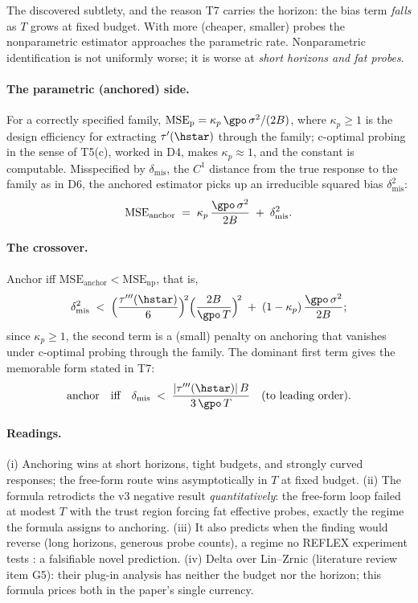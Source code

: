 The discovered subtlety, and the reason T7 carries the horizon: the bias
term \emph{falls} as $T$ grows at fixed budget. With more (cheaper,
smaller) probes the nonparametric estimator approaches the parametric
rate. Nonparametric identification is not uniformly worse; it is worse at
\emph{short horizons and fat probes}.

\paragraph{The parametric (anchored) side.}
For a correctly specified family,
$\mathrm{MSE}_{\mathrm{p}} = \kappa_p\,\gpo\,\sigma^2/(2B)$, where
$\kappa_p \ge 1$ is the design efficiency for extracting $\tau'(\hstar)$
through the family; c-optimal probing in the sense of T5(c), worked in D4,
makes $\kappa_p \approx 1$, and the constant is computable. Misspecified by
$\delta_{\mathrm{mis}}$, the $C^1$ distance from the true response to the
family as in D6, the anchored estimator picks up an irreducible squared
bias $\delta_{\mathrm{mis}}^2$:
\begin{equation*}
  \mathrm{MSE}_{\mathrm{anchor}}
  \;=\; \kappa_p\,\frac{\gpo\,\sigma^2}{2B} \;+\; \delta_{\mathrm{mis}}^2.
\end{equation*}

\paragraph{The crossover.}
Anchor iff $\mathrm{MSE}_{\mathrm{anchor}} < \mathrm{MSE}_{\mathrm{np}}$,
that is,
\begin{equation*}
  \delta_{\mathrm{mis}}^2 \;<\;
  \Big(\frac{\tau'''(\hstar)}{6}\Big)^{\!2}
  \Big(\frac{2B}{\gpo\,T}\Big)^{\!2}
  \;+\; (1 - \kappa_p)\,\frac{\gpo\,\sigma^2}{2B};
\end{equation*}
since $\kappa_p \ge 1$, the second term is a (small) penalty on anchoring
that vanishes under c-optimal probing through the family. The dominant
first term gives the memorable form stated in T7:
\begin{equation*}
  \text{anchor} \quad \text{iff} \quad
  \delta_{\mathrm{mis}} \;<\;
  \frac{|\tau'''(\hstar)|\,B}{3\,\gpo\,T}
  \quad \text{(to leading order)}.
\end{equation*}

\paragraph{Readings.}
(i) Anchoring wins at short horizons, tight budgets, and strongly curved
responses; the free-form route wins asymptotically in $T$ at fixed budget.
(ii) The formula retrodicts the v3 negative result \emph{quantitatively}:
the free-form loop failed at modest $T$ with the trust region forcing fat
effective probes, exactly the regime the formula assigns to anchoring.
(iii) It also predicts when the finding would reverse (long horizons,
generous probe counts), a regime no REFLEX experiment tests \citep{reflex2026}:
a falsifiable novel prediction. (iv) Delta over Lin--Zrnic (literature
review item G5): their plug-in analysis has neither the budget nor the
horizon; this formula prices both in the paper's single currency.

